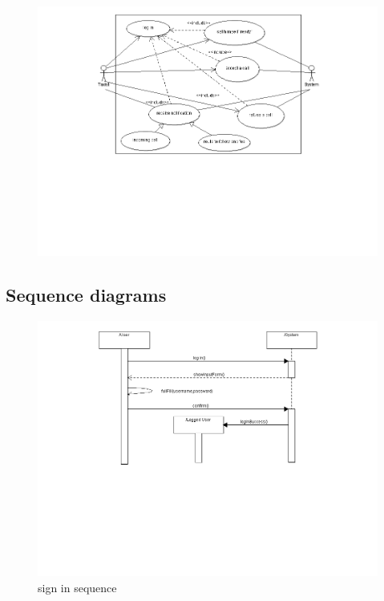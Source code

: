 \begin{itemize}
	\begin{center}
	\begin{figure} [h]
    	\includegraphics [scale=0.5]{taxist.png}
	\end{figure}
	\end{center}
	\newpage


\end{itemize}

\subsection{Sequence diagrams}
\begin{center}
	\begin{figure} [h]
    	\includegraphics [scale=0.5]{sequencelogin.png}
\caption{sign in sequence}
	\end{figure}
	\end{center}
	\newpage

